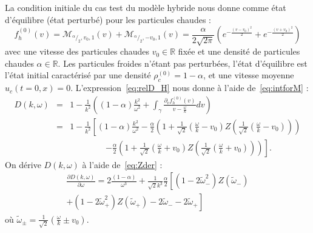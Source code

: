 La condition initiale du cas test du modèle hybride nous donne comme état d'équilibre (état perturbé) pour les particules chaudes :
$$
  f_h^{(0)}(v) = \mathcal{M}_{^\alpha/_2,v_0,1}(v) + \mathcal{M}_{^\alpha/_2,-v_0,1}(v) = \frac{\alpha}{2\sqrt{2\pi}}\left( e^{-\frac{(v-v_0)^2}{2}} + e^{-\frac{(v+v_0)^2}{2}} \right)
$$
avec une vitesse des particules chaudes $v_0\in\mathbb{R}$ fixée et une densité de particules chaudes $\alpha\in\mathbb{R}$. Les particules froides n'étant pas perturbées, l'état d'équilibre est l'état initial caractérisé par une densité $\rho_c^{(0)}= 1-\alpha$, et une vitesse moyenne $u_c(t=0,x)=0$. L'expression~\eqref{eq:relD_H} nous donne à l'aide de~\eqref{eq:intforM} :
\begin{eqnarray}
  D(k,\omega)
    &=&1-\frac{1}{k^2}\left(\left(1-\alpha\right)\frac{k^2}{\omega^2}+\int_\gamma \frac{\partial_vf_h^{(0)}(v)}{v-\frac{\omega}{k}}dv\right)\nonumber\\
    &=&1-\frac{1}{k^2}\left[\left(1-\alpha\right)\frac{k^2}{\omega^2}-\frac{\alpha}{2}\left(1+\frac{1}{\sqrt{2}}\left(\frac{\omega}{k}-v_0\right)Z\left(\frac{1}{\sqrt{2}}\left(\frac{\omega}{k}-v_0\right)\right)\right)\right.\nonumber\\
    &&~~~~~~~~~~~~~~~~~~~\left.-\frac{\alpha}{2}\left(1+\frac{1}{\sqrt{2}}\left(\frac{\omega}{k}+v_0\right)Z\left(\frac{1}{\sqrt{2}}\left(\frac{\omega}{k}+v_0\right)\right)\right)\right].
  \label{eq:D_hchyb}
\end{eqnarray}
On dérive $D(k,\omega)$ à l'aide de~\eqref{eq:Zder} :
\begin{equation}
  \begin{aligned}
    \frac{\partial D(k,\omega)}{\partial \omega} = 2\frac{\left(1-\alpha\right)}{\omega^3}+\frac{1}{\sqrt{2}k^3}\frac{\alpha}{2}\left[\left(1-2\tilde{\omega}_-^2\right)Z\left(\tilde{\omega}_-\right)\right. \\
      \left.+\left(1-2\tilde{\omega}_+^2\right)Z\left(\tilde{\omega}_+\right)-2\tilde{\omega}_--2\tilde{\omega}_+\right]
  \end{aligned}
  \label{eq:hchybderD}
\end{equation}
où $\tilde{\omega}_\pm=\frac{1}{\sqrt{2}}\left(\frac{\omega}{k}\pm v_0\right)$.

